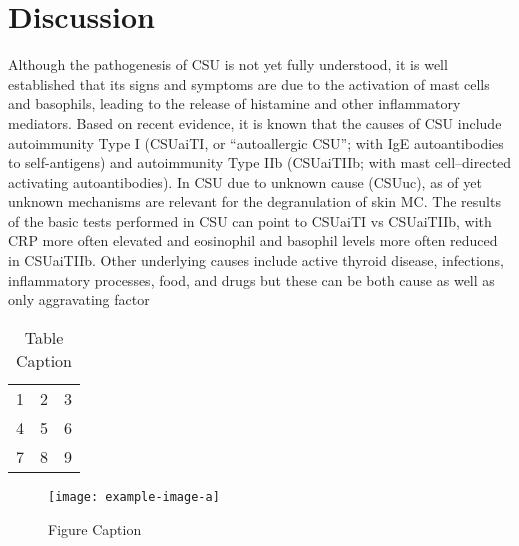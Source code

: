 \documentclass[preprint,12pt,authoryear]{elsarticle}
\begin{document}
\section{Discussion}\label{Discussion}


Although the pathogenesis of CSU is not yet fully understood, it is well established that its signs and symptoms are due to the activation of mast cells and basophils, leading to the release of histamine and other inflammatory mediators\citep{Zuberbier2021The}. 
Based on recent evidence, it is known that the causes of CSU include autoimmunity Type I (CSUaiTI, or “autoallergic CSU”; with IgE autoantibodies to self-antigens) and autoimmunity Type IIb (CSUaiTIIb; with mast cell–directed activating autoantibodies). In CSU due to unknown cause (CSUuc), as of yet unknown mechanisms are relevant for the degranulation of skin MC\citep{sella2023type, Maronese2023IgG}.
The results of the basic tests performed in CSU can point to CSUaiTI vs CSUaiTIIb, with CRP more often elevated and eosinophil and basophil levels more often reduced in CSUaiTIIb\citep{Xiang2023Chronic}.
Other underlying causes include active thyroid disease, infections, inflammatory processes, food, and drugs but these can be both cause as well as only aggravating factor\citep{Kolkhir2021Autoimmune}




\begin{table}[t]%
\centering%
\begin{tabular}{l c r}%
  1 & 2 & 3 \\ %
  4 & 5 & 6 \\
  7 & 8 & 9 \\
\end{tabular}
\caption{Table Caption}\label{fig1}
\end{table}


\begin{figure}[t]%
\centering%
\texttt{[image: example-image-a]}
\caption{Figure Caption}\label{fig2}
\end{figure}
\end{document}
